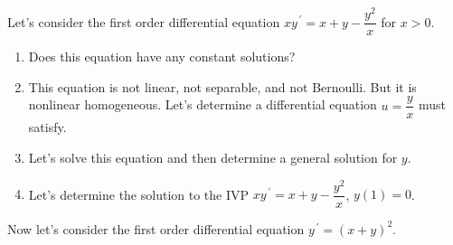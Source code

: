 \documentclass{ximera}
\begin{document}
\newpage

Let's consider the first order differential equation $xy^{\,\prime}=x+y-\dfrac{y^2}{x}$ for $x>0$.

\begin{enumerate}

\item Does this equation have any constant solutions?   

\vfill

\item This equation is not linear, not separable, and not Bernoulli.  But it is nonlinear homogeneous.  Let's determine a differential equation $u=\dfrac{y}{x}$ must satisfy.

\vfill
\vfill




\item Let's solve this equation and then determine a general solution for $y$.




\vfill
\vfill
\vfill

\item  Let's determine the solution to the IVP $xy^{\,\prime}=x+y-\dfrac{y^2}{x}$, $y(1)=0$.


\vspace{1cm}


\end{enumerate}



\newpage


Now let's consider the first order differential equation $y^{\,\prime}=(x+y)^2$.
\end{document}
